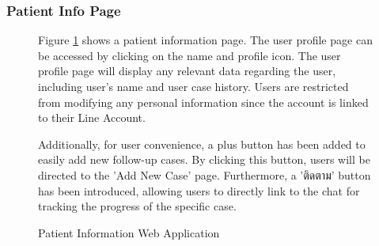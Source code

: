 \documentclass[12pt,oneside,openright,a4paper]{cpe-english-project}
\begin{document}
        \subsubsection{Patient Info Page}
          \begin{figure}[H]
            \centering
            \caption{Patient Information Web Application}\label{fig:WebAppPatientInfo}
            \begin{justify}
              \qquad Figure \ref{fig:WebAppPatientInfo} shows a patient information page. The user profile page can be accessed by clicking on the name and profile icon. The user profile page will display any relevant data regarding the user, including user’s name and user case history. Users are restricted from modifying any personal information since the account is linked to their Line Account.\par
              \qquad Additionally, for user convenience, a plus button has been added to easily add new follow-up cases. By clicking this button, users will be directed to the 'Add New Case' page. Furthermore, a \textthai{'ติดตาม'} button has been introduced, allowing users to directly link to the chat for tracking the progress of the specific case.\par
            \end{justify}       
          \end{figure}
\end{document}
